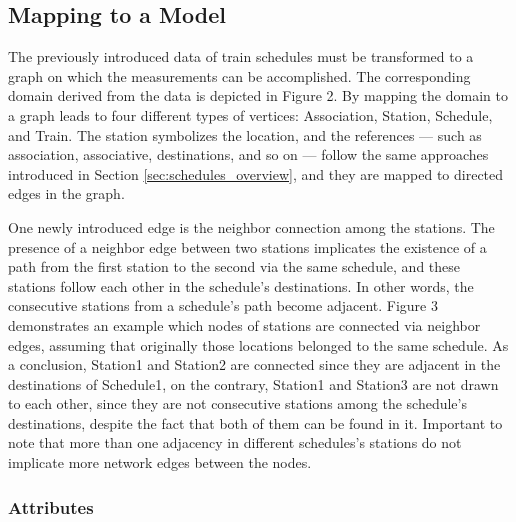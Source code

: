 \subsection{Mapping to a Model}\label{sec:mapping_schedule}

The previously introduced data of train schedules must be transformed to a graph on which the measurements can be accomplished. The corresponding domain derived from the data is depicted in Figure 2. %
By mapping the domain to a graph leads to four different types of vertices: \textsf{Association}, \textsf{Station}, \textsf{Schedule}, and \textsf{Train}. The station symbolizes the location, and the references --- such as \textsf{association}, \textsf{associative}, \textsf{destinations}, and so on --- follow the same approaches introduced in Section \ref{sec:schedules_overview}, and they are mapped to directed edges in the graph. 

One newly introduced edge is the \textsf{neighbor} connection among the stations. The presence of a \textsf{neighbor} edge between two stations implicates the existence of a path from the first station to the second via the same schedule, and these stations follow each other in the schedule's destinations. In other words, the consecutive stations from a schedule's path become adjacent. Figure 3 demonstrates an example which nodes of stations are connected via \textsf{neighbor} edges, assuming that originally those locations belonged to the same schedule. As a conclusion, \textsf{Station1} and \textsf{Station2} are connected since they are adjacent in the destinations of \textsf{Schedule1}, on the contrary, \textsf{Station1} and \textsf{Station3} are not drawn to each other, since they are not consecutive stations among the schedule's destinations, despite the fact that both of them can be found in it. %
Important to note that more than one adjacency in different schedules's stations do not implicate more \textsf{network} edges between the nodes.

\subsubsection{Attributes}

